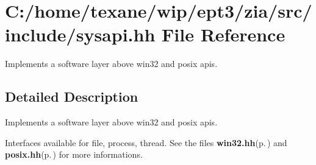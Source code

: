 \section{C:/home/texane/wip/ept3/zia/src/include/sysapi.hh File Reference}
\label{sysapi_8hh}
Implements a software layer above win32 and posix apis. 



\subsection{Detailed Description}
Implements a software layer above win32 and posix apis. 

Interfaces available for file, process, thread. See the files {\bf win32.hh}{\rm (p.\,\pageref{win32_8hh})} and {\bf posix.hh}{\rm (p.\,\pageref{posix_8hh})} for more informations. 